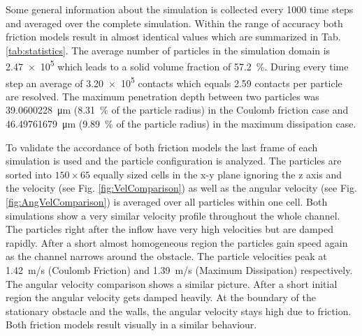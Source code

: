 \documentclass[global,twocolumn]{svjour}
\begin{document}
	Some general information about the simulation is collected every 1000 time steps and averaged over the complete simulation. Within the range of accuracy both friction models result in almost identical values which are summarized in Tab. \ref{tab:statistics}. The average number of particles in the simulation domain is \num{2.47e5} which leads to a solid volume fraction of \SI{57.2}{\percent}. During every time step an average of \num{3.20e5} contacts which equals \num{2.59} contacts per particle are resolved. The maximum penetration depth between two particles was \SI[round-mode = figures, round-precision=3]{39.0600228}{\micro m} (\SI{8.31}{\percent} of the particle radius) in the Coulomb friction case and \SI[round-mode = figures, round-precision=3]{46.49761679}{\micro m} (\SI{9.89}{\percent} of the particle radius) in the maximum dissipation case.

	\begin{figure}
	\end{figure}

	\begin{figure}
	\end{figure}

	To validate the accordance of both friction models the last frame of each simulation is used and the particle configuration is analyzed. The particles are sorted into $\num{150} \times \num{65}$ equally sized cells in the x-y plane ignoring the z axis and the velocity (see Fig. \ref{fig:VelComparison}) as well as the angular velocity (see Fig. \ref{fig:AngVelComparison}) is averaged over all particles within one cell. Both simulations show a very similar velocity profile throughout the whole channel. The particles right after the inflow have very high velocities but are damped rapidly. After a short almost homogeneous region the particles gain speed again as the channel narrows around the obstacle. The particle velocities peak at \SI{1.42}{m/s} (Coulomb Friction) and \SI{1.39}{m/s} (Maximum Dissipation) respectively. The angular velocity comparison shows a similar picture. After a short initial region the angular velocity gets damped heavily. At the boundary of the stationary obstacle and the walls, the angular velocity stays high due to friction. Both friction models result visually in a similar behaviour.
\end{document}
